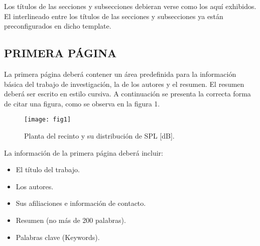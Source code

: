Los títulos de las secciones y subsecciones debieran verse como los aquí exhibidos. El interlineado entre los títulos de las secciones y subsecciones ya están preconfigurados en dicho template.
    \subsection{PRIMERA PÁGINA}   
        La primera página deberá contener un área predefinida para la información básica del trabajo de investigación, la de los autores y el resumen. El resumen deberá ser escrito en estilo cursiva. A continuación se presenta la correcta forma de citar una figura, como se observa en la figura 1.
        \begin{figure}[H]
            \texttt{[image: fig1]} %
            \caption{Planta del recinto y su distribución de SPL [dB].}
            \centering
        \end{figure}
        La información de la primera página deberá incluir:
            \begin{itemize}
                \item El título del trabajo.
                \item Los autores.
                \item Sus afiliaciones e información de contacto.
                \item Resumen (no más de 200 palabras).
                \item Palabras clave (Keywords).
            \end{itemize}
            